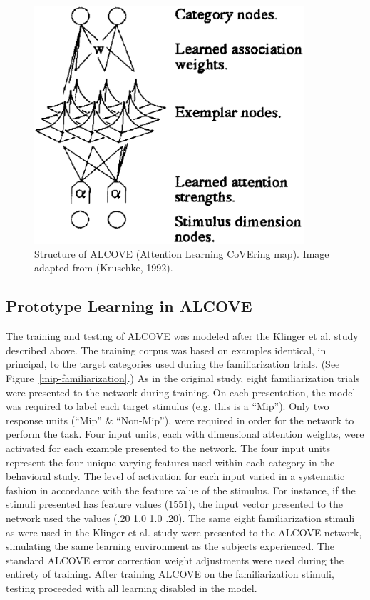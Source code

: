 \documentclass[man]{apa}
\begin{document}
\begin{figure}[ht]
\begin{center}
	\includegraphics[width=100mm]{figures/alcove.eps}
\end{center}
\caption{Structure of ALCOVE (Attention Learning CoVEring map).  Image adapted from (Kruschke, 1992).}
\label{alcove}
\end{figure} 

\subsection{Prototype Learning in ALCOVE}
The training and testing of ALCOVE was modeled after the Klinger et al. study described above.  The training corpus was based on examples identical, in principal, to the target categories used during the familiarization trials. (See Figure~\ref{mip-familiarization}.)  As in the original study, eight familiarization trials were presented to the network during training.  On each presentation, the model was required to label each target stimulus (e.g. this is a ``Mip'').  Only two response units (``Mip'' \& ``Non-Mip''), were required in order for the network to perform the task.  Four input units, each with dimensional attention weights, were activated for each example presented to the network.  The four input units represent the four unique varying features used within each category in the behavioral study.  The level of activation for each input varied in a systematic fashion in accordance with the feature value of the stimulus.  For instance, if the stimuli presented has feature values (1551), the input vector presented to the network used the values (.20 1.0 1.0 .20). The same eight familiarization stimuli as were used in the Klinger et al. study were presented to the ALCOVE network, simulating the same learning environment as the subjects experienced.  The standard ALCOVE error correction weight adjustments were used during the entirety of training.   After training ALCOVE on the familiarization stimuli, testing proceeded with all learning disabled in the model.  
\end{document}
